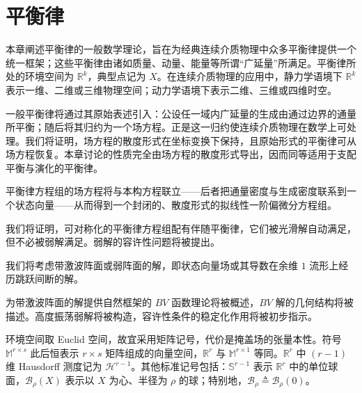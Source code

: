 \documentclass[../main.tex]{subfiles}
\begin{document}
\chapter{平衡律}\label{chapter:ch01-平衡律}

本章阐述平衡律的一般数学理论，旨在为经典连续介质物理中众多平衡律提供一个统一框架；这些平衡律由诸如质量、动量、能量等所谓“广延量”所满足。平衡律所处的环境空间为 $\mathbb{R}^{k}$，典型点记为 $X$。在连续介质物理的应用中，静力学语境下 $\mathbb{R}^{k}$ 表示一维、二维或三维物理空间；动力学语境下表示二维、三维或四维时空。

一般平衡律将通过其原始表述引入：公设任一域内广延量的生成由通过边界的通量所平衡；随后将其归约为一个场方程。正是这一归约使连续介质物理在数学上可处理。我们将证明，场方程的散度形式在坐标变换下保持，且原始形式的平衡律可从场方程恢复。本章讨论的性质完全由场方程的散度形式导出，因而同等适用于支配平衡与演化的平衡律。

平衡律方程组的场方程将与本构方程联立——后者把通量密度与生成密度联系到一个状态向量——从而得到一个封闭的、散度形式的拟线性一阶偏微分方程组。

我们将证明，可对称化的平衡律方程组配有伴随平衡律，它们被光滑解自动满足，但不必被弱解满足。弱解的容许性问题将被提出。

我们将考虑带激波阵面或弱阵面的解，即状态向量场或其导数在余维 $1$ 流形上经历跳跃间断的解。

为带激波阵面的解提供自然框架的 $BV$ 函数理论将被概述，$BV$ 解的几何结构将被描述。高度振荡弱解将被构造，容许性条件的稳定化作用将被初步指示。

环境空间取 Euclid 空间，故宜采用矩阵记号，代价是掩盖场的张量本性。符号 $\mathbb{M}^{r\times s}$ 此后恒表示 $r\times s$ 矩阵组成的向量空间，$\mathbb{R}^{r}$ 与 $\mathbb{M}^{r\times 1}$ 等同。$\mathbb{R}^{r}$ 中 $(r-1)$ 维 Hausdorff 测度记为 $\mathscr{H}^{r-1}$。其他标准记号包括：$\mathbb{S}^{r-1}$ 表示 $\mathbb{R}^{r}$ 中的单位球面，$\mathscr{B}_{\rho}(X)$ 表示以 $X$ 为心、半径为 $\rho$ 的球；特别地，$\mathscr{B}_{\rho}\triangleq\mathscr{B}_{\rho}(0)$。











\end{document}
